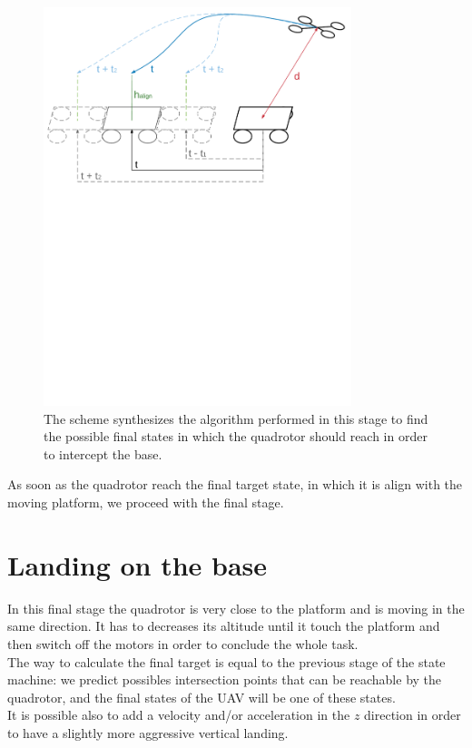 \begin{figure}[!htbp]
    \centering
    \includegraphics[width=0.8\textwidth]{img/prediction_platform.pdf}
    \caption{The scheme synthesizes the algorithm performed in this stage to find the possible final states in which the quadrotor should reach in order to intercept the base. }
    \label{fig:align_platform}
\end{figure}

As soon as the quadrotor reach the final target state, in which it is align with the moving platform, we proceed with the final stage.
\newpage
\section{Landing on the base}
In this final stage the quadrotor is very close to the platform and is moving in the same direction. It has to decreases its altitude until it touch the platform and then switch off the motors in order to conclude the whole task.\\

The way to calculate the final target is equal to the previous stage of the state machine: we predict possibles intersection points that can be reachable by the quadrotor, and the final states of the UAV will be one of these states.\\
It is possible also to add a velocity and/or acceleration in the $z$ direction in order to have a slightly more aggressive vertical landing.\\

